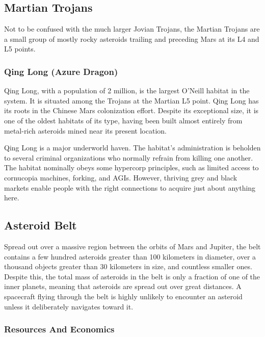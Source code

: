 \subsection{Martian Trojans}

Not to be confused with the much larger Jovian Trojans, the Martian Trojans are a small group of mostly 
rocky asteroids trailing and preceding Mars at its L4 
and L5 points.

\subsubsection{Qing Long (Azure Dragon)}

Qing Long, with a population of 2 million, is the 
largest O'Neill habitat in the system. It is situated 
among the Trojans at the Martian L5 point. Qing 
Long has its roots in the Chinese Mars colonization 
effort. Despite its exceptional size, it is one of the 
oldest habitats of its type, having been built almost 
entirely from metal-rich asteroids mined near its 
present location.

Qing Long is a major underworld haven. The habitat's administration is beholden to several criminal 
organizations who normally refrain from killing one 
another. The habitat nominally obeys some hypercorp 
principles, such as limited access to cornucopia machines, forking, and AGIs. However, thriving grey and 
black markets enable people with the right connections to acquire just about anything here.

\subsection{Asteroid Belt}

Spread out over a massive region between the orbits 
of Mars and Jupiter, the belt contains a few hundred 
asteroids greater than 100 kilometers in diameter, over 
a thousand objects greater than 30 kilometers in size, 
and countless smaller ones. Despite this, the total mass 
of asteroids in the belt is only a fraction of one of the 
inner planets, meaning that asteroids are spread out 
over great distances. A spacecraft flying through the 
belt is highly unlikely to encounter an asteroid unless 
it deliberately navigates toward it.

\subsubsection{Resources And Economics}

